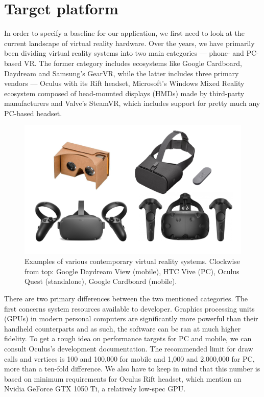 \documentclass[thesis=M,english,hidelinks]{FITthesisXE}[2012/06/26]
\begin{document}
\section{Target platform}

In order to specify a baseline for our application, we first need to look at the current landscape of virtual reality hardware. Over the years, we have primarily been dividing virtual reality systems into two main categories --- phone- and PC-based VR. The former category includes ecosystems like Google Cardboard\autocite{cardboard}, Daydream\autocite{daydream} and Samsung's GearVR\autocite{gearvr}, while the latter includes three primary vendors --- Oculus with its Rift headset\autocite{rift}, Microsoft's Windows Mixed Reality\autocite{wmr} ecosystem composed of head-mounted displays (HMDs) made by third-party manufacturers and Valve's SteamVR\autocite{steamvr}, which includes support for pretty much any PC-based headset.

\begin{figure}[ht]
\centering
\includegraphics[scale=0.2]{hmd_examples}
\caption{Examples of various contemporary virtual reality systems. Clockwise from top: Google Daydream View (mobile), HTC Vive (PC), Oculus Quest (standalone), Google Cardboard (mobile).}
\label{fig:hmd_examples}
\end{figure}

There are two primary differences between the two mentioned categories. The first concerns system resources available to developer. Graphics processing units (GPUs) in modern personal computers are significantly more powerful than their handheld counterparts and as such, the software can be ran at much higher fidelity. To get a rough idea on performance targets for PC and mobile, we can consult Oculus's development documentation. The recommended limit for draw calls and vertices is 100 and 100,000 for mobile and 1,000 and 2,000,000 for PC, more than a ten-fold difference.\autocite{oculusperftargets} We also have to keep in mind that this number is based on minimum requirements for Oculus Rift headset, which mention an Nvidia GeForce GTX 1050 Ti, a relatively low-spec GPU.\autocite{riftspecs}
\end{document}
